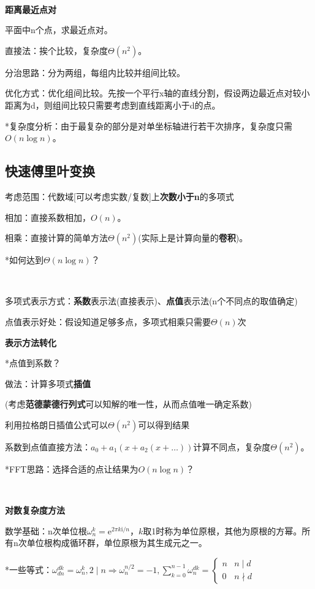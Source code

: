 \documentclass[a4paper,UTF8,fontset=windows]{ctexart}
\begin{document}
\

\textbf{距离最近点对}

平面中n个点，求最近点对。

直接法：挨个比较，复杂度$\Theta(n^2)$。

分治思路：分为两组，每组内比较并组间比较。

优化方式：优化组间比较。先按一个平行x轴的直线分割，假设两边最近点对较小距离为d，则组间比较只需要考虑到直线距离小于d的点。

*\hspace{0em}复杂度分析：由于最复杂的部分是对单坐标轴进行若干次排序，复杂度只需$O(n\log n)$。

\subsection{快速傅里叶变换}

考虑范围：代数域[可以考虑实数/复数]上\textbf{次数小于n}的多项式

相加：直接系数相加，$O(n)$。

相乘：直接计算的简单方法$\Theta(n^2)$(实际上是计算向量的\textbf{卷积})。

*\hspace{0em}如何达到$\Theta(n\log n)$？

\

多项式表示方式：\textbf{系数}表示法(直接表示)、\textbf{点值}表示法(n个不同点的取值确定)

点值表示好处：假设知道足够多点，多项式相乘只需要$\Theta(n)$次

\textbf{表示方法转化}

*\hspace{0em}点值到系数？

做法：计算多项式\textbf{插值}

(考虑\textbf{范德蒙德行列式}可以知解的唯一性，从而点值唯一确定系数)

利用拉格朗日插值公式可以$\Theta(n^2)$可以得到结果

系数到点值直接方法：$a_0+a_1(x+a_2(x+\dots))$计算不同点，复杂度$\Theta(n^2)$。

*\hspace{0em}FFT思路：选择合适的点让结果为$O(n\log n)$？

\

\textbf{对数复杂度方法}

数学基础：n次单位根$\omega_n^k=\mathrm{e}^{2\pi k\mathrm{i}/n}$，$k$取1时称为单位原根，其他为原根的方幂。所有n次单位根构成循环群，单位原根为其生成元之一。

*\hspace{0em}一些等式：$\omega_{dn}^{dk}=\omega_n^k,2\mid n\Rightarrow\omega_n^{n/2}=-1,\sum_{k=0}^{n-1}\omega_n^{dk}=\begin{cases}n&n\mid d\\0&n\nmid d\end{cases}$
\end{document}
